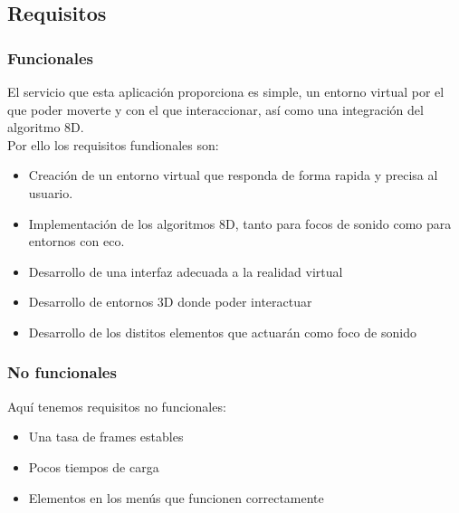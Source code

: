 \subsection{Requisitos}
\subsubsection{Funcionales}

\quad El servicio que esta aplicación proporciona es simple, un entorno virtual por el que poder moverte y con el que interaccionar, así como una integración del algoritmo 8D.\\

\quad Por ello los requisitos fundionales son:
\begin{itemize}
	\item Creación de un entorno virtual que responda de forma rapida y precisa al usuario.
	\item Implementación de los algoritmos 8D, tanto para focos de sonido como para entornos con eco.
	\item Desarrollo de una interfaz adecuada a la realidad virtual
	\item Desarrollo de entornos 3D donde poder interactuar
	\item Desarrollo de los distitos elementos que actuarán como foco de sonido 
\end{itemize}


\subsubsection{No funcionales}

\quad Aquí tenemos requisitos no funcionales:
\begin{itemize}
	\item Una tasa de frames estables
	\item Pocos tiempos de carga 
	\item Elementos en los menús que funcionen correctamente
\end{itemize}

\newpage
